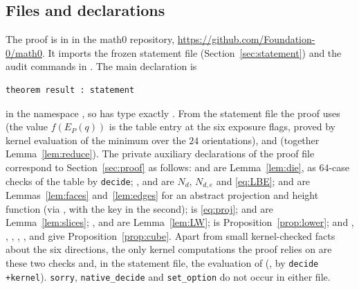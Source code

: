 \documentclass[11pt]{amsart}
\theoremstyle{plain}
\theoremstyle{definition}
\begin{document}
\subsection*{Files and declarations}
The proof is in  in the math0 repository, \url{https://github.com/Foundation-0/math0}. It imports the frozen statement file  (Section~\ref{sec:statement}) and the audit commands in . The main declaration is
\begin{lstlisting}
theorem result : statement
\end{lstlisting}
in the namespace , so  has type exactly . From the statement file the proof uses  (the value $f(E_P(q))$ is the table entry  at the six exposure flags, proved by kernel evaluation of the minimum over the $24$ orientations),  and  (together Lemma~\ref{lem:reduce}). The private auxiliary declarations of the proof file correspond to Section~\ref{sec:proof} as follows:  and  are Lemma~\ref{lem:die}, as $64$-case checks of the table by \texttt{decide}; ,  and  are $N_d$, $N_{d,e}$ and \eqref{eq:LBE};  and  are Lemmas~\ref{lem:faces} and~\ref{lem:edges} for an abstract projection and height function (via , with the key  in the second);  is \eqref{eq:proj};  and  are Lemma~\ref{lem:slices}; ,  and  are Lemma~\ref{lem:LW};  is Proposition~\ref{prop:lower}; and , , , , ,  and  give Proposition~\ref{prop:cube}. Apart from small kernel-checked facts about the six directions, the only kernel computations the proof relies on are these two checks and, in the statement file, the evaluation of  (, by \texttt{decide +kernel}). \texttt{sorry}, \texttt{native\_decide} and \texttt{set\_option} do not occur in either file.
\end{document}
